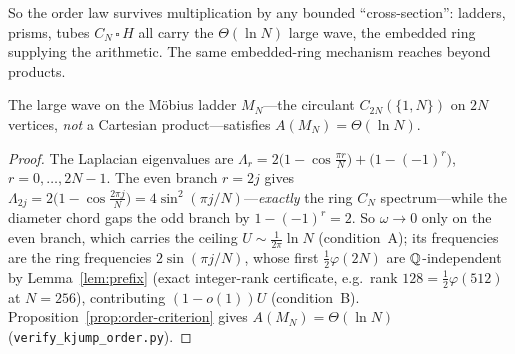 \noindent So the order law survives multiplication by any bounded ``cross-section'': ladders, prisms,
tubes $C_N\,\square\,H$ all carry the $\Theta(\ln N)$ large wave, the embedded ring supplying the
arithmetic. The same embedded-ring mechanism reaches beyond products.

\begin{corollary}\label{cor:mobius}
The large wave on the M\"obius ladder $M_N$---the circulant $C_{2N}(\{1,N\})$ on $2N$ vertices, \emph{not}
a Cartesian product---satisfies $A(M_N)=\Theta(\ln N)$.
\end{corollary}

\begin{proof}
The Laplacian eigenvalues are $\Lambda_r=2\bigl(1-\cos\tfrac{\pi r}{N}\bigr)+\bigl(1-(-1)^r\bigr)$,
$r=0,\dots,2N-1$. The even branch $r=2j$ gives $\Lambda_{2j}=2\bigl(1-\cos\tfrac{2\pi j}{N}\bigr)=
4\sin^2(\pi j/N)$---\emph{exactly} the ring $C_N$ spectrum---while the diameter chord gaps the odd branch by
$1-(-1)^r=2$. So $\omega\to0$ only on the even branch, which carries the ceiling $U\sim\tfrac1{2\pi}\ln N$
(condition~A); its frequencies are the ring frequencies $2\sin(\pi j/N)$, whose first $\tfrac12\varphi(2N)$
are $\mathbb{Q}$-independent by Lemma~\ref{lem:prefix} (exact integer-rank certificate, e.g.\ rank
$128=\tfrac12\varphi(512)$ at $N=256$), contributing $(1-o(1))U$ (condition~B).
Proposition~\ref{prop:order-criterion} gives $A(M_N)=\Theta(\ln N)$
(\texttt{verify\_kjump\_order.py}). \end{proof}


